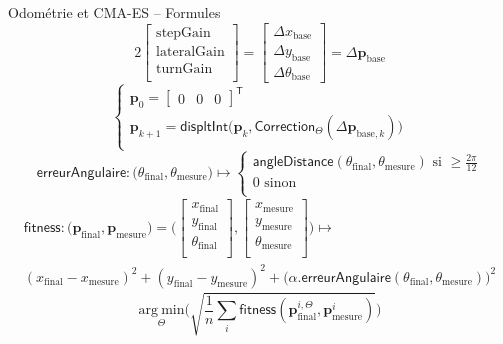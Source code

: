 \begin{frame}[noframenumbering]{Odométrie et CMA-ES -- Formules}
    $$
    2
    \begin{bmatrix}
        \text{stepGain} \\
        \text{lateralGain} \\
        \text{turnGain} \\
    \end{bmatrix}
    =
    \begin{bmatrix}
        \Delta x_{\text{base}} \\   
        \Delta y_{\text{base}} \\   
        \Delta \theta_{\text{base}}
    \end{bmatrix}
    =
    \Delta \bm{p}_{\text{base}}
    $$
    $$
    \begin{cases}
    \bm{p}_{0} = \begin{bmatrix} 0 & 0 & 0 \end{bmatrix}^{\mathsf{T}} \\
        \bm{p}_{k+1} = \mathsf{displtInt}\big(\bm{p}_{k}, \mathsf{Correction}_{\Theta}(\Delta \bm{p}_{\text{base}, k}) \big) \\
    \end{cases}
    $$
    $$
    \mathsf{erreurAngulaire} : 
    \big( \theta_{\text{final}}, \theta_{\text{mesure}} \big) 
    \longmapsto 
    \begin{cases}
        \mathsf{angleDistance}(\theta_{\text{final}}, \theta_{\text{mesure}})
        \text{ si } \geqslant \frac{2\pi}{12} \\
        0 \text{ sinon} \\
    \end{cases}
    $$
    \begin{gather*}
    \mathsf{fitness} : 
    \big( \bm{p}_{\text{final}}, \bm{p}_{\text{mesure}} \big)
    =
    \big( \begin{bmatrix} x_{\text{final}}\\ y_{\text{final}}\\ \theta_{\text{final}}\\ \end{bmatrix}, 
    \begin{bmatrix} x_{\text{mesure}}\\ y_{\text{mesure}}\\ \theta_{\text{mesure}}\\ \end{bmatrix} \big)
    \longmapsto \\
    (x_{\text{final}} - x_{\text{mesure}})^{2} + (y_{\text{final}} - y_{\text{mesure}})^{2}
    + \big( \alpha.\mathsf{erreurAngulaire}(\theta_{\text{final}}, \theta_{\text{mesure}}) \big)^{2}
    \end{gather*}
    $$
    \underset{\Theta}{\mathrm{arg~min}} 
    \big( \sqrt{\frac{1}{n}\sum_{i} \mathsf{fitness}(\bm{p}_{\text{final}}^{i, \Theta}, \bm{p}_{\text{mesure}}^{i})} \big)
    $$
\end{frame}


